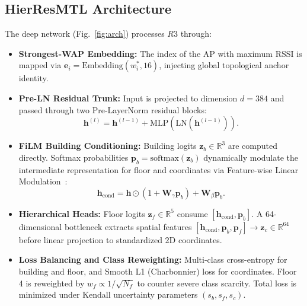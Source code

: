\documentclass[conference]{IEEEtran}
\begin{document}
\subsection{HierResMTL Architecture}
The deep network (Fig.~\ref{fig:arch}) processes $R3$ through:
\begin{itemize}
    \item \textbf{Strongest-WAP Embedding:} The index of the AP with maximum RSSI is mapped via $\mathbf{e}_i = \text{Embedding}(w_i^*, 16)$, injecting global topological anchor identity.
    \item \textbf{Pre-LN Residual Trunk:} Input is projected to dimension $d=384$ and passed through two Pre-LayerNorm residual blocks:
    \begin{equation}
    \mathbf{h}^{(l)} = \mathbf{h}^{(l-1)} + \text{MLP}\left(\text{LN}\left(\mathbf{h}^{(l-1)}\right)\right).
    \end{equation}
    \item \textbf{FiLM Building Conditioning:} Building logits $\mathbf{z}_b \in \mathbb{R}^3$ are computed directly. Softmax probabilities $\mathbf{p}_b = \text{softmax}(\mathbf{z}_b)$ dynamically modulate the intermediate representation for floor and coordinates via Feature-wise Linear Modulation~\cite{perez2018film}:
    \begin{equation}
    \mathbf{h}_{\text{cond}} = \mathbf{h} \odot \left(1 + \mathbf{W}_\gamma \mathbf{p}_b\right) + \mathbf{W}_\beta \mathbf{p}_b.
    \end{equation}
    \item \textbf{Hierarchical Heads:} Floor logits $\mathbf{z}_f \in \mathbb{R}^5$ consume $[\mathbf{h}_{\text{cond}}, \mathbf{p}_b]$. A 64-dimensional bottleneck extracts spatial features $[\mathbf{h}_{\text{cond}}, \mathbf{p}_b, \mathbf{p}_f] \rightarrow \mathbf{z}_c \in \mathbb{R}^{64}$ before linear projection to standardized 2D coordinates.
    \item \textbf{Loss Balancing and Class Reweighting:} Multi-class cross-entropy for building and floor, and Smooth L1 (Charbonnier) loss for coordinates. Floor 4 is reweighted by $w_f \propto 1/\sqrt{N_f}$ to counter severe class scarcity. Total loss is minimized under Kendall uncertainty parameters $(s_b, s_f, s_c)$.
\end{itemize}
\end{document}
